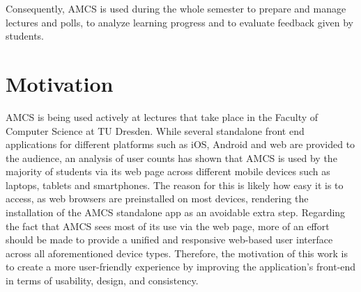 Consequently, AMCS is used during the whole semester to prepare and manage lectures and polls, to analyze learning progress and to evaluate feedback given by students.
\newline
\newline
\section{Motivation}
AMCS is being used actively at lectures that take place in the Faculty of Computer Science at TU Dresden.
While several standalone front end applications for different platforms such as iOS, Android and web are provided to the audience, an analysis of user counts has shown that AMCS is used by the majority of students via its web page across different mobile devices such as laptops, tablets and smartphones.
The reason for this is likely how easy it is to access, as web browsers are preinstalled on most devices, rendering the installation of the AMCS standalone app as an avoidable extra step.
\newline
\newline 
Regarding the fact that AMCS sees most of its use via the web page, more of an effort should be made to provide a unified and responsive web-based user interface across all aforementioned device types.
\newline
\newline 
Therefore, the motivation of this work is to create a more user-friendly experience by improving the application's front-end in terms of usability, design, and consistency.
